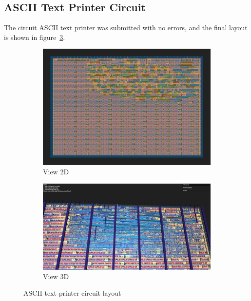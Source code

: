 \subsection{ASCII Text Printer Circuit}
The circuit ASCII text printer was submitted with no errors, and the final layout is shown in figure\ \ref{fig:ASCII_Layout}.
\begin{figure}[H]
    \centering
    \begin{subfigure}[b]{0.45\textwidth}
        \includegraphics[width=\linewidth]{Pictures/Result_ASCII_2D_View.png}
        \caption{View 2D}\label{fig:ASCII_2D}
    \end{subfigure}
    \begin{subfigure}[b]{0.45\textwidth}
        \includegraphics[width=\linewidth]{Pictures/Result_ASCII_3D_View.png}
        \caption{View 3D}\label{fig:ASCII_3D}
    \end{subfigure}
    \caption{ASCII text printer circuit layout}\label{fig:ASCII_Layout}
\end{figure}

